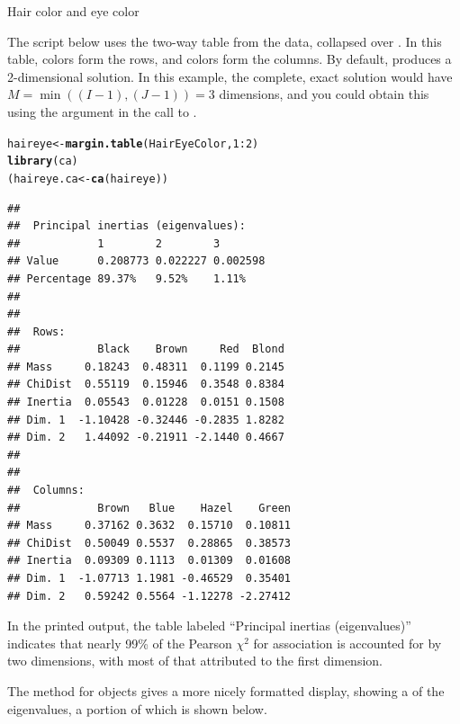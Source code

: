 \documentclass[11pt]{book}\usepackage[]{graphicx}\usepackage[]{color}
\makeatletter
\newcommand{\hlnum}[1]{\textcolor[rgb]{0.686,0.059,0.569}{#1}}%
\newcommand{\hlopt}[1]{\textcolor[rgb]{0,0,0}{#1}}%
\newcommand{\hlstd}[1]{\textcolor[rgb]{0.345,0.345,0.345}{#1}}%
\newcommand{\hlkwb}[1]{\textcolor[rgb]{0.69,0.353,0.396}{#1}}%
\newcommand{\hlkwd}[1]{\textcolor[rgb]{0.737,0.353,0.396}{\textbf{#1}}}%
\newenvironment{kframe}{%
 \def\at@end@of@kframe{}%
 \ifinner\ifhmode%
  \def\at@end@of@kframe{\end{minipage}}%
  \begin{minipage}{\columnwidth}%
 \fi\fi%
 \def\FrameCommand##1{\hskip\@totalleftmargin \hskip-\fboxsep
 \colorbox{shadecolor}{##1}\hskip-\fboxsep
     \hskip-\linewidth \hskip-\@totalleftmargin \hskip\columnwidth}%
 \MakeFramed {\advance\hsize-\width
   \@totalleftmargin\z@ \linewidth\hsize
   \@setminipage}}%
 {\par\unskip\endMakeFramed%
 \at@end@of@kframe}
\newenvironment{knitrout}{}{} %
\renewenvironment{knitrout}{\small\renewcommand{\baselinestretch}{.85}}{} %
\makeatother
\begin{document}
\begin{Example}[haireye3]{Hair color and eye color}

The script below uses the two-way table  from the
 data, collapsed over .
In this table,  colors form the rows, and  colors
form the columns.  By default,  produces a 2-dimensional
solution.  In this example, the complete, exact solution would
have $M = \min((I-1), (J-1)) = 3$ dimensions, and you could obtain this
using the argument  in the call to .

\begin{knitrout}
\color{fgcolor}\begin{kframe}
\begin{alltt}
\hlstd{haireye} \hlkwb{<-} \hlkwd{margin.table}\hlstd{(HairEyeColor,} \hlnum{1}\hlopt{:}\hlnum{2}\hlstd{)}
\hlkwd{library}\hlstd{(ca)}
\hlstd{(haireye.ca} \hlkwb{<-} \hlkwd{ca}\hlstd{(haireye))}
\end{alltt}
\begin{verbatim}
## 
##  Principal inertias (eigenvalues):
##            1        2        3       
## Value      0.208773 0.022227 0.002598
## Percentage 89.37%   9.52%    1.11%   
## 
## 
##  Rows:
##            Black    Brown     Red  Blond
## Mass     0.18243  0.48311  0.1199 0.2145
## ChiDist  0.55119  0.15946  0.3548 0.8384
## Inertia  0.05543  0.01228  0.0151 0.1508
## Dim. 1  -1.10428 -0.32446 -0.2835 1.8282
## Dim. 2   1.44092 -0.21911 -2.1440 0.4667
## 
## 
##  Columns:
##            Brown   Blue    Hazel    Green
## Mass     0.37162 0.3632  0.15710  0.10811
## ChiDist  0.50049 0.5537  0.28865  0.38573
## Inertia  0.09309 0.1113  0.01309  0.01608
## Dim. 1  -1.07713 1.1981 -0.46529  0.35401
## Dim. 2   0.59242 0.5564 -1.12278 -2.27412
\end{verbatim}
\end{kframe}
\end{knitrout}

In the printed output, the table labeled ``Principal inertias (eigenvalues)''
indicates that nearly 99\% of the
Pearson
\(\chi^2\) for association is accounted for by two dimensions, with
most of that attributed to the first dimension.

The  method for  objects gives a more nicely formatted
display, showing a  of the eigenvalues, a portion of
which is shown below.


\end{Example}
\end{document}

